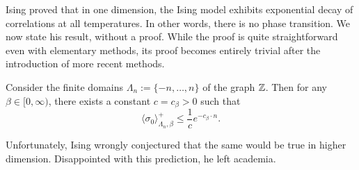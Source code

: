 Ising proved that in one dimension, the Ising model exhibits exponential decay of correlations at all temperatures.
In other words, there is no phase transition.
We now state his result, without a proof.
While the proof is quite straightforward even with elementary methods,
its proof becomes entirely trivial after the introduction of more recent methods.

\begin{theorem}[Ising, 1924]
    \label{thm:Ising}
    Consider the finite domains $\Lambda_n:=\{-n,\dots,n\}$ of the graph $\mathbb Z$.
    Then for any $\beta\in[0,\infty)$,
    there exists a constant $c=c_\beta>0$ such that
    \[
        \langle\sigma_0\rangle_{\Lambda_n,\beta}^+
        \leq \frac1ce^{-c_\beta\cdot n}.
    \]
\end{theorem}

Unfortunately, Ising wrongly conjectured that the same would be true in higher dimension.
Disappointed with this prediction, he left academia.
